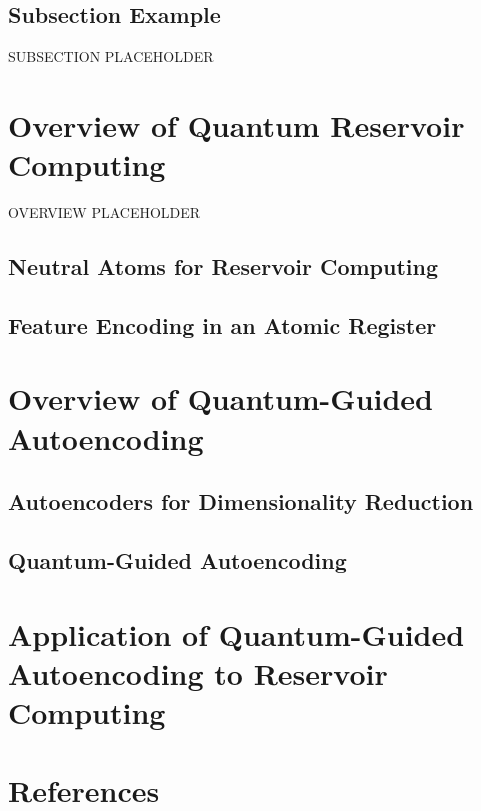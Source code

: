 \documentclass[conference]{IEEEtran}
\begin{document}
\subsection{Subsection Example}

SUBSECTION PLACEHOLDER

\section{Overview of Quantum Reservoir Computing}

OVERVIEW PLACEHOLDER

\subsection{Neutral Atoms for Reservoir Computing}

\subsection{Feature Encoding in an Atomic Register}

\section{Overview of Quantum-Guided Autoencoding}

\subsection{Autoencoders for Dimensionality Reduction}

\subsection{Quantum-Guided Autoencoding}

\section{Application of Quantum-Guided Autoencoding to Reservoir Computing}





\section*{References}
\end{document}
